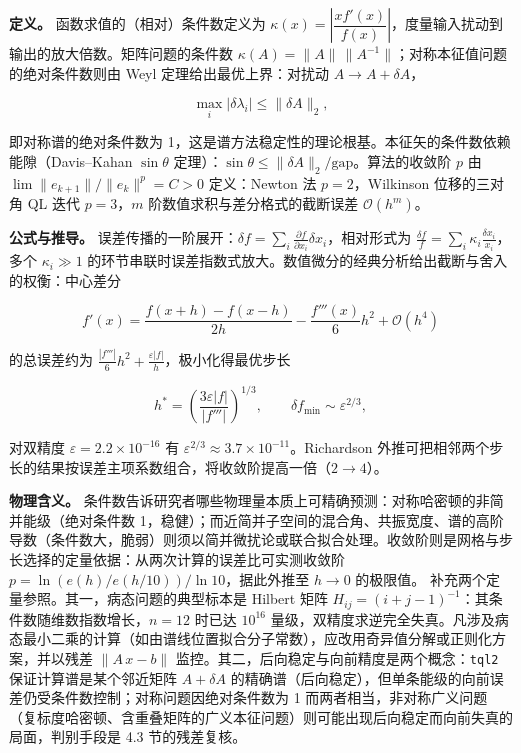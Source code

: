\documentclass[
]{ctexbook}
\begin{document}
\textbf{定义。} 函数求值的（相对）条件数定义为
\(\kappa(x)=\left|\dfrac{x f'(x)}{f(x)}\right|\)，度量输入扰动到输出的放大倍数。矩阵问题的条件数
\(\kappa(A)=\|A\|\,\|A^{-1}\|\)；对称本征值问题的绝对条件数则由 Weyl
定理给出最优上界：对扰动 \(A\to A+\delta A\)，

\[\max_i|\delta\lambda_i|\le\|\delta A\|_{2},\]

即对称谱的绝对条件数为
1，这是谱方法稳定性的理论根基。本征矢的条件数依赖能隙（Davis--Kahan
\(\sin\theta\)
定理）：\(\sin\theta\le\|\delta A\|_{2}/\mathrm{gap}\)。算法的收敛阶
\(p\) 由 \(\lim\|e_{k+1}\|/\|e_k\|^{p}=C>0\) 定义：Newton 法
\(p=2\)，Wilkinson 位移的三对角 QL 迭代 \(p=3\)，\(m\)
阶数值求积与差分格式的截断误差 \(\mathcal{O}(h^{m})\)。

\textbf{公式与推导。}
误差传播的一阶展开：\(\delta f=\sum_i\frac{\partial f}{\partial x_i}\delta x_i\)，相对形式为
\(\frac{\delta f}{f}=\sum_i\kappa_i\frac{\delta x_i}{x_i}\)，多个
\(\kappa_i\gg1\)
的环节串联时误差指数式放大。数值微分的经典分析给出截断与舍入的权衡：中心差分

\[f'(x)=\frac{f(x+h)-f(x-h)}{2h}-\frac{f'''(x)}{6}h^{2}+\mathcal{O}(h^{4})\]

的总误差约为
\(\frac{|f'''|}{6}h^{2}+\frac{\varepsilon|f|}{h}\)，极小化得最优步长

\[h^{*}=\left(\frac{3\varepsilon|f|}{|f'''|}\right)^{1/3},\qquad
\delta f_{\min}\sim\varepsilon^{2/3},\]

对双精度 \(\varepsilon=2.2\times10^{-16}\) 有
\(\varepsilon^{2/3}\approx3.7\times10^{-11}\)。Richardson
外推可把相邻两个步长的结果按误差主项系数组合，将收敛阶提高一倍（\(2\to4\)）。

\textbf{物理含义。}
条件数告诉研究者哪些物理量本质上可精确预测：对称哈密顿的非简并能级（绝对条件数
1，稳健）；而近简并子空间的混合角、共振宽度、谱的高阶导数（条件数大，脆弱）则须以简并微扰论或联合拟合处理。收敛阶则是网格与步长选择的定量依据：从两次计算的误差比可实测收敛阶
\(p=\ln(e(h)/e(h/10))/\ln 10\)，据此外推至 \(h\to0\) 的极限值。
补充两个定量参照。其一，病态问题的典型标本是 Hilbert 矩阵
\(H_{ij}=(i+j-1)^{-1}\)：其条件数随维数指数增长，\(n=12\) 时已达
\(10^{16}\)
量级，双精度求逆完全失真。凡涉及病态最小二乘的计算（如由谱线位置拟合分子常数），应改用奇异值分解或正则化方案，并以残差
\(\|A\,x-b\|\) 监控。其二，后向稳定与向前精度是两个概念：\texttt{tql2}
保证计算谱是某个邻近矩阵 \(A+\delta A\)
的精确谱（后向稳定），但单条能级的向前误差仍受条件数控制；对称问题因绝对条件数为
1
而两者相当，非对称广义问题（复标度哈密顿、含重叠矩阵的广义本征问题）则可能出现后向稳定而向前失真的局面，判别手段是
4.3 节的残差复核。
\end{document}
